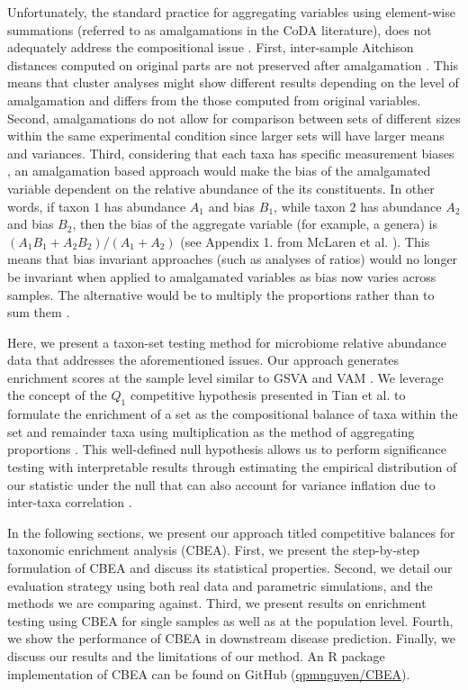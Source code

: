 \documentclass[10pt,letterpaper]{article}
\providecommand{\DIFaddtex}[1]{{\protect\color{blue}\uwave{#1}}} %
\providecommand{\DIFdeltex}[1]{{\protect\color{red}\sout{#1}}}                      %
\providecommand{\DIFaddbegin}{} %
\providecommand{\DIFaddend}{} %
\providecommand{\DIFdelbegin}{} %
\providecommand{\DIFdelend}{} %
\providecommand{\DIFadd}[1]{\texorpdfstring{\DIFaddtex{#1}}{#1}} %
\providecommand{\DIFdel}[1]{\texorpdfstring{\DIFdeltex{#1}}{}} %
\newcommand{\DIFscaledelfig}{0.5}
\newlength{\DIFdelgraphicswidth} %
\newlength{\DIFdelgraphicsheight} %
\newcommand{\DIFaddincludegraphics}[2][]{{\color{blue}\fbox{\DIFOincludegraphics[#1]{#2}}}} %
\newcommand{\DIFdelincludegraphics}[2][]{%
\sbox{\DIFdelgraphicsbox}{\DIFOincludegraphics[#1]{#2}}%
\settoboxwidth{\DIFdelgraphicswidth}{\DIFdelgraphicsbox} %
\settoboxtotalheight{\DIFdelgraphicsheight}{\DIFdelgraphicsbox} %
\scalebox{\DIFscaledelfig}{%
\parbox[b]{\DIFdelgraphicswidth}{\usebox{\DIFdelgraphicsbox}\\[-\baselineskip] \rule{\DIFdelgraphicswidth}{0em}}\llap{\resizebox{\DIFdelgraphicswidth}{\DIFdelgraphicsheight}{%
\setlength{\unitlength}{\DIFdelgraphicswidth}%
\begin{picture}(1,1)%
\thicklines\linethickness{2pt} %
{\color[rgb]{1,0,0}\put(0,0){\framebox(1,1){}}}%
{\color[rgb]{1,0,0}\put(0,0){\line( 1,1){1}}}%
{\color[rgb]{1,0,0}\put(0,1){\line(1,-1){1}}}%
\end{picture}%
}\hspace*{3pt}}} %
} %
\DeclareRobustCommand{\DIFaddbegin}{\DIFOaddbegin \let\includegraphics\DIFaddincludegraphics} %
\DeclareRobustCommand{\DIFaddend}{\DIFOaddend \let\includegraphics\DIFOincludegraphics} %
\DeclareRobustCommand{\DIFdelbegin}{\DIFOdelbegin \let\includegraphics\DIFdelincludegraphics} %
\DeclareRobustCommand{\DIFdelend}{\DIFOaddend \let\includegraphics\DIFOincludegraphics} %
\begin{document}
Unfortunately, the standard practice for aggregating variables using element-wise summations (referred to as amalgamations in the CoDA literature), does not adequately address the compositional issue \cite{mclaren2019}. First, inter-sample Aitchison distances computed on original parts are not preserved after amalgamation \cite{egozcue2005}. This means that cluster analyses might show different results depending on the level of amalgamation and differs from the those computed from original variables. Second, amalgamations do not allow for comparison between sets of different sizes within the same experimental condition since larger sets will have larger means and variances. Third, considering that each taxa has specific measurement biases \cite{mclaren2019}, an amalgamation based approach would make the bias of the amalgamated variable dependent on the relative abundance of the its constituents. In other words, if taxon $1$ has abundance $A_1$ and bias $B_1$, while taxon $2$ has abundance $A_2$ and bias $B_2$, then the bias of the aggregate variable (for example, a genera) is $(A_1B_1 + A_2B_2)/(A_1 + A_2)$ (see Appendix 1. from McLaren et al. \cite{mclaren2019}). This means that bias invariant approaches (such as analyses of ratios) would no longer be invariant when applied to amalgamated variables as bias now varies across samples. The alternative would be to multiply the proportions rather than to sum them \cite{egozcue2005}. 

Here, we present a taxon-set testing method for microbiome relative abundance data that addresses the aforementioned issues. Our approach generates enrichment scores at the sample level similar to GSVA \cite{hanzelmann2013} and VAM \cite{frost2020}. We leverage the concept of the $Q_1$ competitive hypothesis presented in Tian et al. \cite{tian2005} to formulate the enrichment of a set as the compositional balance \cite{rivera-pinto2018} of taxa within the set and remainder taxa using multiplication as the method of aggregating proportions \cite{egozcue2005}. This well-defined null hypothesis allows us to perform significance testing with interpretable results through estimating the empirical distribution of our statistic under the null that can also account for variance inflation due to inter-taxa correlation \cite{wu2012}. 

In the following sections, we present our approach titled competitive balances for taxonomic enrichment analysis (CBEA). First, we present the step-by-step formulation of CBEA and discuss its statistical properties. Second, we detail our evaluation strategy using both real data and parametric simulations, and the methods we are comparing against. Third, we present results on enrichment testing using CBEA for single samples as well as at the population level. Fourth, we show the performance of CBEA in downstream disease prediction. Finally, we discuss our results and the limitations of our method. An R package implementation of CBEA can be \DIFaddbegin \DIFadd{installed via Bioconductor. The development version can be }\DIFaddend found on GitHub (\DIFdelbegin \href{\DIFdel{www.github.com/qpmnguyen/teaR}}%
\DIFdelend \DIFaddbegin \href{\DIFadd{www.github.com/qpmnguyen/CBEA}}{\DIFaddend qpmnguyen/CBEA}).
\end{document}
